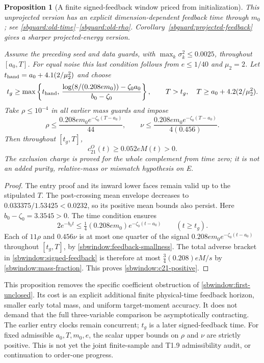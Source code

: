 \documentclass{article} %
\theoremstyle{plain}
\newtheorem{proposition}[theorem]{Proposition}
\theoremstyle{definition}
\theoremstyle{remark}
\begin{document}
\begin{proposition}[A finite signed-feedback window priced from initialization]
\label{sbwindow:positive-feedback}
This unprojected version has an explicit dimension-dependent feedback time through $m_0$; see \eqref{sbguard:old-time}--\eqref{sbguard:old-rho}. Corollary~\ref{sbguard:projected-feedback} gives a sharper projected-energy version.

Assume the preceding seed and data guards, with
$\max_k\sigma_k^2\le0.0025$, throughout $[a_0,T]$.
For equal noise this last condition follows from $e\le1/40$ and $\mu_2=2$.
Let $t_{\rm hand}=a_0+4.1(2/\mu_2^2)$ and choose
\begin{equation}\label{sbwindow:feedback-time}
 t_g\ge\max\left\{t_{\rm hand},\,
 \frac{\log(8/(0.208e m_0))-\zeta_0a_0}{b_0-\zeta_0}\right\},
 \qquad T>t_g,\quad T\ge a_0+4.2(2/\mu_2^2).
\end{equation}
Take $\rho\le10^{-4}$ in all earlier mass guards and impose
\begin{equation}\label{sbwindow:feedback-smallness}
 \rho\le\frac{0.208e m_0e^{-\zeta_0(T-a_0)}}{44},\qquad
 \nu\le\frac{0.208e m_0e^{-\zeta_0(T-a_0)}}{4(0.456)}.
\end{equation}
Then throughout $[t_g,T]$,
\begin{equation}\label{sbwindow:c21-positive}
 \boxed{c_{21}^O(t)\ge0.052eM(t)>0.}
\end{equation}
The exclusion charge is proved for the whole complement from time zero;
it is not an added purity, relative-mass or mismatch hypothesis on E.
\end{proposition}
\begin{proof}
The entry proof and its inward lower faces remain valid up to the
stipulated $T$. The post-crossing mean envelope decreases to
$0.033375/1.53425<0.0232$, so its positive mean bounds also persist.
Here $b_0-\zeta_0=3.3545>0$.
The time condition ensures
\[
 2e^{-b_0t}\le\tfrac14(0.208e m_0)e^{-\zeta_0(t-a_0)}
 \qquad(t\ge t_g).
\]
Each of $11\rho$ and $0.456\nu$ is at most one quarter of the signal
$0.208e m_0e^{-\zeta_0(t-a_0)}$ throughout $[t_g,T]$, by
\eqref{sbwindow:feedback-smallness}. The total adverse bracket in
\eqref{sbwindow:signed-feedback} is therefore at most
$\tfrac34(0.208)eM/s$ by \eqref{sbwindow:mass-fraction}.
This proves \eqref{sbwindow:c21-positive}.
\end{proof}

This proposition removes the specific coefficient obstruction of
\eqref{sbwindow:first-unclosed}. Its cost is an explicit additional
finite physical-time feedback horizon, smaller early total mass, and
uniform target-moment accuracy. It does not demand that the full
three-variable comparison be asymptotically contracting. The earlier
entry clocks remain concurrent; $t_g$ is a later signed-feedback time.
For fixed admissible $a_0,T,m_0,e$, the scalar upper bounds on $\rho$ and
$\nu$ are strictly positive. This is not yet the joint finite-sample and
T1.9 admissibility audit, or continuation to order-one progress.
\end{document}
